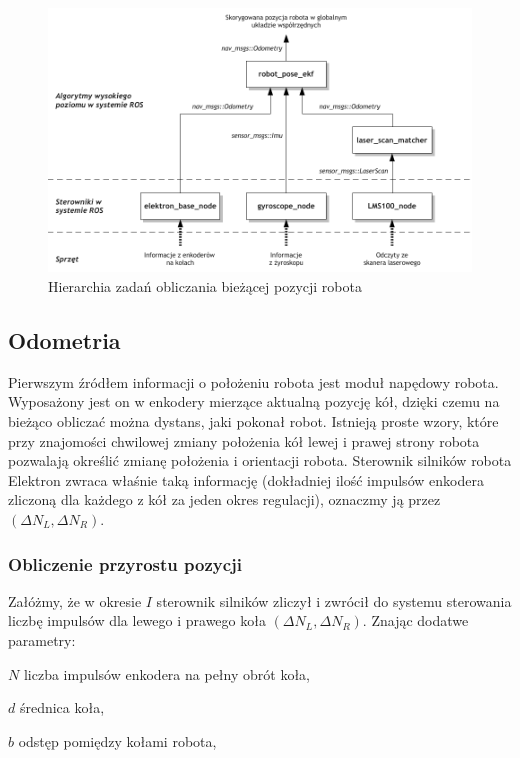 \begin{figure}[h!]
\centering
\includegraphics{../img/diag_position}
\caption{Hierarchia zadań obliczania bieżącej pozycji robota}
\label{fig:diag_pos}
\end{figure}

\subsection{Odometria}

Pierwszym źródłem informacji o położeniu robota jest moduł napędowy robota.
Wyposażony jest on w enkodery mierzące aktualną pozycję kół, dzięki czemu na
bieżąco obliczać można dystans, jaki pokonał robot. Istnieją proste wzory, które
przy znajomości chwilowej zmiany położenia kół lewej i prawej strony robota
pozwalają określić zmianę położenia i orientacji robota. Sterownik silników
robota Elektron zwraca właśnie taką informację (dokładniej ilość impulsów
enkodera zliczoną dla każdego z kół za jeden okres regulacji), oznaczmy ją przez
$(\Delta N_L, \Delta N_R)$.

\subsubsection{Obliczenie przyrostu pozycji}

Załóżmy, że w okresie $I$ sterownik silników zliczył i zwrócił do systemu
sterowania liczbę impulsów dla lewego i prawego koła $(\Delta N_L, \Delta N_R)$.
Znając dodatwe parametry:


\begin{mydescription}{5pt}
\item[$N$] liczba impulsów enkodera na pełny obrót koła,
\item[$d$] średnica koła,
\item[$b$] odstęp pomiędzy kołami robota, 
\end{mydescription}

